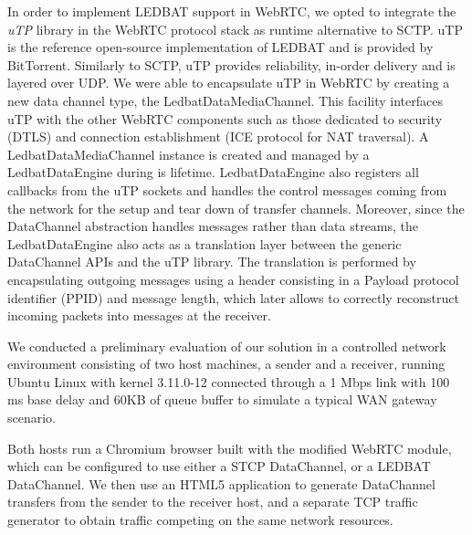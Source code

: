 \documentclass{sig-alternate}
\begin{document}
In order to implement LEDBAT support in WebRTC, we opted to integrate the \textit{uTP}
library \cite{utp-repo} in the WebRTC protocol stack as runtime alternative to SCTP. uTP
is the reference open-source implementation of LEDBAT and is provided by BitTorrent.
Similarly to SCTP, uTP provides reliability, in-order delivery and is layered over UDP. We
were able to encapsulate uTP in WebRTC by creating a new data channel type, the
LedbatDataMediaChannel. This facility interfaces uTP with the other WebRTC components such
as those dedicated to security (DTLS) and connection establishment (ICE protocol for NAT
traversal). A LedbatDataMediaChannel instance is created and managed by a LedbatDataEngine
during is lifetime. LedbatDataEngine also registers all callbacks from the uTP sockets and
handles the control messages coming from the network for the setup and tear down of
transfer channels. Moreover, since the DataChannel abstraction handles messages rather
than data streams, the LedbatDataEngine also acts as a translation layer between the
generic DataChannel APIs and the uTP library. The translation is performed by
encapsulating outgoing messages using a header consisting in a Payload protocol identifier
(PPID) and message length, which later allows to correctly reconstruct incoming packets
into messages at the receiver.




We conducted a preliminary evaluation of our solution in a controlled network environment
consisting of two host machines, a sender and a receiver, running Ubuntu Linux with kernel
3.11.0-12 connected through a 1 Mbps link with 100 ms base delay and 60KB of queue
buffer to simulate a typical WAN gateway scenario.

%

Both hosts run a Chromium browser built with the modified WebRTC module, which can be configured to use either a STCP DataChannel, or a LEDBAT DataChannel. We then use an HTML5 application to generate DataChannel transfers from the sender to the receiver host, and a separate TCP traffic generator to obtain traffic competing on the same network resources.
\end{document}

